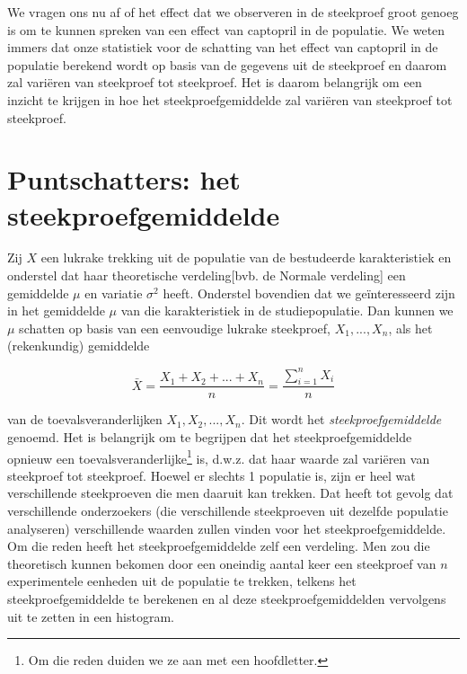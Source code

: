 \documentclass[12pt,dutch,coursenotes]{book}
\let\rmarkdownfootnote\footnote%
\def\footnote{\protect\rmarkdownfootnote}
\theoremstyle{definition}
\theoremstyle{definition}
\theoremstyle{definition}
\theoremstyle{remark}
\begin{document}
We vragen ons nu af of het effect dat we observeren in de steekproef
groot genoeg is om te kunnen spreken van een effect van captopril in de
populatie. We weten immers dat onze statistiek voor de schatting van het
effect van captopril in de populatie berekend wordt op basis van de
gegevens uit de steekproef en daarom zal variëren van steekproef tot
steekproef. Het is daarom belangrijk om een inzicht te krijgen in hoe
het steekproefgemiddelde zal variëren van steekproef tot steekproef.

\section{Puntschatters: het
steekproefgemiddelde}\label{puntschatters-het-steekproefgemiddelde}

Zij \(X\) een lukrake trekking uit de populatie van de bestudeerde
karakteristiek en onderstel dat haar theoretische verdeling{[}bvb. de
Normale verdeling{]} een gemiddelde \(\mu\) en variatie \(\sigma^2\)
heeft. Onderstel bovendien dat we geïnteresseerd zijn in het gemiddelde
\(\mu\) van die karakteristiek in de studiepopulatie. Dan kunnen we
\(\mu\) schatten op basis van een eenvoudige lukrake steekproef,
\(X_1,...,X_n\), als het (rekenkundig) gemiddelde

\begin{equation*}
\bar X = \frac{X_1+ X_2+ ... + X_n}{n} = \frac{\sum_{i=1}^{n} X_i}{n}
\end{equation*}

van de toevalsveranderlijken \(X_1,X_2, ..., X_n\). Dit wordt het
\emph{steekproefgemiddelde} genoemd. Het is belangrijk om te begrijpen
dat het steekproefgemiddelde opnieuw een toevalsveranderlijke\footnote{Om
  die reden duiden we ze aan met een hoofdletter.} is, d.w.z. dat haar
waarde zal variëren van steekproef tot steekproef. Hoewel er slechts 1
populatie is, zijn er heel wat verschillende steekproeven die men
daaruit kan trekken. Dat heeft tot gevolg dat verschillende onderzoekers
(die verschillende steekproeven uit dezelfde populatie analyseren)
verschillende waarden zullen vinden voor het steekproefgemiddelde. Om
die reden heeft het steekproefgemiddelde zelf een verdeling. Men zou die
theoretisch kunnen bekomen door een oneindig aantal keer een steekproef
van \(n\) experimentele eenheden uit de populatie te trekken, telkens
het steekproefgemiddelde te berekenen en al deze steekproefgemiddelden
vervolgens uit te zetten in een histogram.
\end{document}
